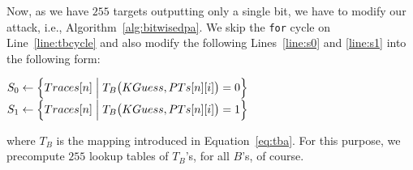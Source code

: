 	Now, as we have $255$ targets outputting only a single bit, we have to modify our attack, i.e., Algorithm~\ref{alg:bitwisedpa}. We skip the {\tt for} cycle on Line~\ref{line:tbcycle} and also modify the following Lines~\ref{line:s0} and \ref{line:s1} into the following form:
	\begin{algorithmic}[1]
		\setcounter{ALG@line}{5}
		\State $S_0 \gets \Bigl\{ Traces[n] \Bigm| T_B\bigl(KGuess, PTs[n][i]\bigr) = 0 \Bigr\}$
		\State $S_1 \gets \Bigl\{ Traces[n] \Bigm| T_B\bigl(KGuess, PTs[n][i]\bigr) = 1 \Bigr\}$
	\end{algorithmic}
	where $T_B$ is the mapping introduced in Equation~\ref{eq:tba}. For this purpose, we precompute $255$ lookup tables of $T_B$'s, for all $B$'s, of course.
	

